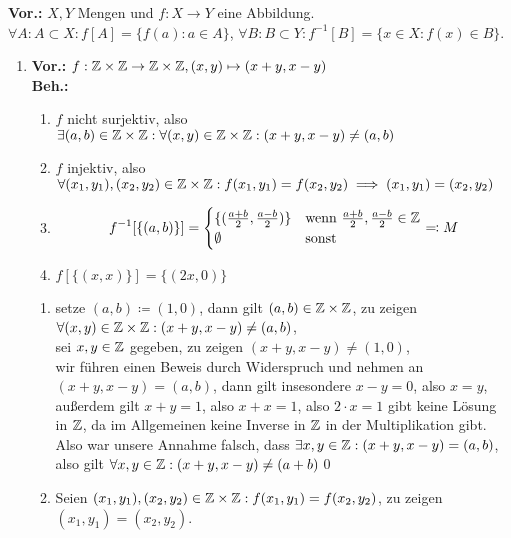 \documentclass{gadsescript}
\begin{document}
\maketitle
\textbf{Vor.:} $ X, Y $ Mengen und $ f : X \to Y $ eine Abbildung. $ \forall A: A \subset X : f[A] = \{ f(a) : a \in A \} $, $ \forall B: B \subset Y : f^{-1}[B] = \{ x \in X : f(x) \in B \} $.
\begin{enumerate}[label=(\alph*)]
	\item \textbf{Vor.:} $ f : \mathbb{Z} \times \mathbb{Z} \to \mathbb{Z} \times \mathbb{Z}, (x, y) \mapsto ( x + y, x - y) $\\
		\textbf{Beh.:}
		\begin{enumerate}[label=(\roman*)]
			\item $ f $ nicht surjektiv, also $ \exists (a, b) \in \mathbb{Z} \times \mathbb{Z} : \forall (x, y) \in \mathbb{Z} \times \mathbb{Z} : (x + y, x - y) \neq (a, b) $
			\item $ f $ injektiv, also $ \forall (x_1, y_1), (x_2, y_2) \in \mathbb{Z} \times \mathbb{Z} : f(x_1, y_1) = f(x_2, y_2) \implies (x_1, y_1) = (x_2, y_2)$
			\item \[ f^{-1} [\{(a, b)\}] =
				\begin{cases}
					\{ (\frac{a+b}{2}, \frac{a-b}{2}) \} & \text{wenn } \frac{a + b}{2}, \frac{a - b}{2} \in \mathbb{Z}\\
					\emptyset & \text{sonst}
				\end{cases} \eqqcolon M
				\]
			\item $ f[\{(x,x)\}] = \{(2x, 0)\} $
		\end{enumerate}
		\begin{proof*}[(i) -]
			\begin{enumerate}[label=(\roman*)]
				\item setze $ (a, b) \coloneqq (1, 0) $, dann gilt $ (a, b) \in \mathbb{Z} \times \mathbb{Z} $, zu zeigen $ \forall (x, y) \in \mathbb{Z} \times \mathbb{Z} : (x + y, x - y) \neq (a, b) $,\\
					sei $ x, y \in \mathbb{Z} $ gegeben, zu zeigen $ (x + y, x - y) \neq (1, 0) $,\\
					wir führen einen Beweis durch Widerspruch und nehmen an $ ( x + y, x - y ) = ( a, b ) $, dann gilt insesondere $ x - y = 0 $, also $ x = y $,
					außerdem gilt $ x + y = 1 $, also $ x + x = 1 $, also $ 2 \cdot x = 1 $ \Lightning gibt keine Lösung in $ \mathbb{Z} $, da im Allgemeinen keine Inverse in $\mathbb{Z}$ in der Multiplikation gibt. Also war unsere Annahme falsch, dass $ \exists x, y \in \mathbb{Z} : ( x + y, x - y ) = ( a , b ) $, also gilt $ \forall x, y \in \mathbb{Z} : ( x + y, x - y) \neq ( a + b) $\qed
				\item Seien $(x_1, y_1), (x_2, y_2) \in \mathbb{Z} \times \mathbb{Z} : f(x_1, y_1) = f(x_2, y_2) $, zu zeigen $ (x_1, y_1) = (x_2, y_2) $.\\

\end{enumerate}
\end{proof*}
\end{enumerate}
\end{document}
